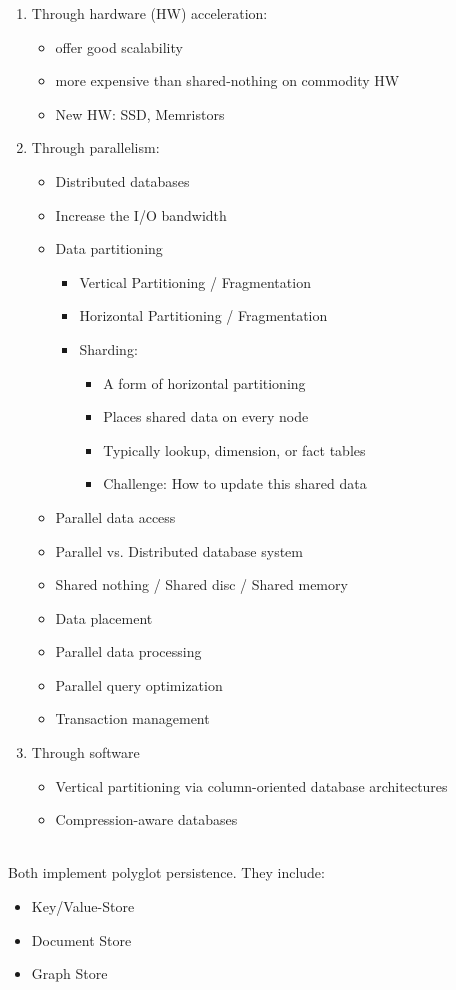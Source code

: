 \begin{breakbox}
\begin{enumerate}
	\item Through hardware (HW) acceleration:
		\begin{itemize}
			\item offer good scalability
			\item more expensive than shared-nothing on commodity HW
			\item New HW: SSD, Memristors
		\end{itemize}
	\item Through parallelism:
		\begin{itemize}
			\item Distributed databases
			\item Increase the I/O bandwidth
			\item Data partitioning
				\begin{itemize}
					\item Vertical Partitioning / Fragmentation
					\item Horizontal Partitioning / Fragmentation
					\item Sharding:
						\begin{itemize}
							\item A form of horizontal partitioning
							\item Places shared data on every node
							\item Typically lookup, dimension, or fact tables
							\item Challenge: How to update this shared data
						\end{itemize}
				\end{itemize}
			\item Parallel data access
			\item Parallel vs. Distributed database system
			\item Shared nothing / Shared disc / Shared memory
			\item Data placement
			\item Parallel data processing
			\item Parallel query optimization
			\item Transaction management
		\end{itemize}
	\item Through software
		\begin{itemize}
			\item Vertical partitioning via column-oriented database architectures
			\item Compression-aware databases
		\end{itemize}
\end{enumerate}
\end{breakbox}

\begin{breakbox}
	\\
	Both implement polyglot persistence. They include:
	\begin{itemize}
		\item Key/Value-Store
		\item Document Store
		\item Graph Store
	\end{itemize}
\end{breakbox}
